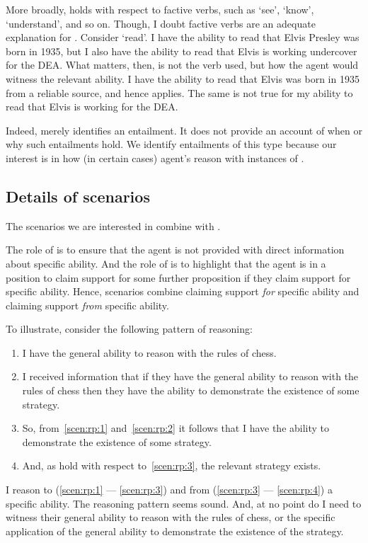 \begin{note}
  More broadly,  holds with respect to factive verbs, such as `see', `know', `understand', and so on.
  Though, I doubt factive verbs are an adequate explanation for .
  Consider `read'.
  I have the ability to read that Elvis Presley was born in 1935, but I also have the ability to read that Elvis is working undercover for the DEA.
  What matters, then, is not the verb used, but how the agent would witness the relevant ability.
  I have the ability to read that Elvis was born in 1935 from a reliable source, and hence  applies.
  The same is not true for my ability to read that Elvis is working for the DEA.

  Indeed,  merely identifies an entailment.
  It does not provide an account of when or why such entailments hold.
  We identify entailments of this type because our interest is in how (in certain cases) agent's reason with instances of .
\end{note}

\subsection{Details of scenarios}
\label{sec:scenarios}

\begin{note}
  The scenarios we are interested in combine \gsi{} with .

  The role of \gsi{} is to ensure that the agent is not provided with direct information about specific ability.
  And the role of  is to highlight that the agent is in a position to claim support for some further proposition if they claim support for specific ability.
  Hence, scenarios combine claiming support \emph{for} specific ability and claiming support \emph{from} specific ability.

  To illustrate, consider the following pattern of reasoning:
  \begin{enumerate}[label=\arabic*., ref=(\arabic*)]
  \item\label{scen:rp:1} I have the general ability to reason with the rules of chess.
  \item\label{scen:rp:2} I received \gsi{} information that if they have the general ability to reason with the rules of chess then they have the ability to demonstrate the existence of some strategy.
  \item\label{scen:rp:3} So, from~\ref{scen:rp:1} and~\ref{scen:rp:2} it follows that I have the ability to demonstrate the existence of some strategy.
  \item\label{scen:rp:4} And, as  hold with respect to~\ref{scen:rp:3}, the relevant strategy exists.
  \end{enumerate}
  I reason to (\ref{scen:rp:1} --- \ref{scen:rp:3}) and from (\ref{scen:rp:3} --- \ref{scen:rp:4}) a specific ability.
  The reasoning pattern seems sound.
  And, at no point do I need to witness their general ability to reason with the rules of chess, or the specific application of the general ability to demonstrate the existence of the strategy.
\end{note}

